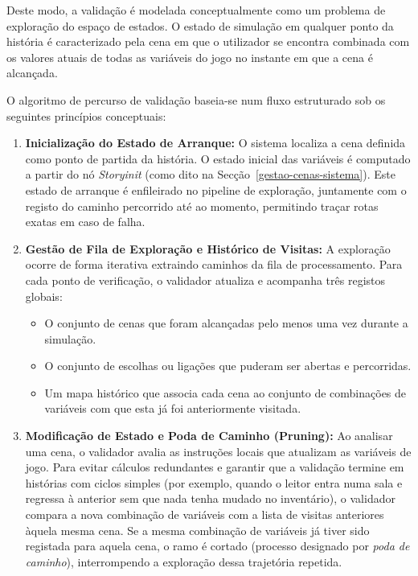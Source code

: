 Deste modo, a validação é modelada conceptualmente como um problema de exploração do espaço de estados. O estado de simulação em qualquer ponto da história é caracterizado pela cena em que o utilizador se encontra combinada com os valores atuais de todas as variáveis do jogo no instante em que a cena é alcançada.

O algoritmo de percurso de validação baseia-se num fluxo estruturado sob os seguintes princípios conceptuais:

\begin{enumerate}
    \item \textbf{Inicialização do Estado de Arranque:}
    O sistema localiza a cena definida como ponto de partida da história. O estado inicial das variáveis é computado a partir do nó \textit{Storyinit} (como dito na Secção~\ref{gestao-cenas-sistema}). Este estado de arranque é enfileirado no pipeline de exploração, juntamente com o registo do caminho percorrido até ao momento, permitindo traçar rotas exatas em caso de falha.

    \item \textbf{Gestão de Fila de Exploração e Histórico de Visitas:}
    A exploração ocorre de forma iterativa extraindo caminhos da fila de processamento. Para cada ponto de verificação, o validador atualiza e acompanha três registos globais:
    \begin{itemize}
        \item O conjunto de cenas que foram alcançadas pelo menos uma vez durante a simulação.
        \item O conjunto de escolhas ou ligações que puderam ser abertas e percorridas.
        \item Um mapa histórico que associa cada cena ao conjunto de combinações de variáveis com que esta já foi anteriormente visitada.
    \end{itemize}

    \item \textbf{Modificação de Estado e Poda de Caminho (Pruning):}
    Ao analisar uma cena, o validador avalia as instruções locais que atualizam as variáveis de jogo. Para evitar cálculos redundantes e garantir que a validação termine em histórias com ciclos simples (por exemplo, quando o leitor entra numa sala e regressa à anterior sem que nada tenha mudado no inventário), o validador compara a nova combinação de variáveis com a lista de visitas anteriores àquela mesma cena. Se a mesma combinação de variáveis já tiver sido registada para aquela cena, o ramo é cortado (processo designado por \textit{poda de caminho}), interrompendo a exploração dessa trajetória repetida.


\end{enumerate}

